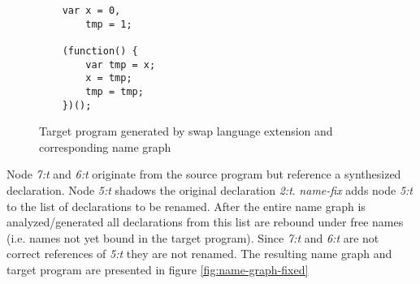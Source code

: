 \begin{figure}[h]
\centering
\begin{minipage}{0.25\linewidth}
\begin{lstlisting}
	var x = 0, 
		tmp = 1;
		
	(function() {
		var tmp = x;
		x = tmp;
		tmp = tmp;
	})();
\end{lstlisting}
\end{minipage}
\hfill
\begin{minipage}{0.65\linewidth}
\end{minipage}

\caption{Target program generated by swap language extension and corresponding name graph} \label{fig:name-graph}
\end{figure}

Node \textit{7:t} and \textit{6:t} originate from the source program but reference a synthesized declaration. Node \textit{5:t} shadows the original declaration \textit{2:t}. \textit{name-fix} adds node \textit{5:t} to the list of declarations to be renamed. After the entire name graph is analyzed/generated all declarations from this list are rebound under free names (i.e. names not yet bound in the target program). Since \textit{7:t} and \textit{6:t} are not correct references of \textit{5:t} they are not renamed. The resulting name graph and target program are presented in figure \ref{fig:name-graph-fixed}  


